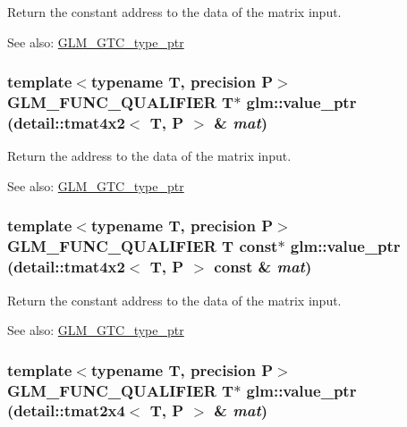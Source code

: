 Return the constant address to the data of the matrix input. \begin{Desc}
\item[See also:]\hyperlink{group__gtc__type__ptr}{GLM\_\-GTC\_\-type\_\-ptr} \end{Desc}
\hypertarget{group__gtc__type__ptr_gcf65ffcdfc741ebebedfc7a50e2bde7f}{
\subsubsection[value\_\-ptr]{\setlength{\rightskip}{0pt plus 5cm}template$<$typename T, precision P$>$ GLM\_\-FUNC\_\-QUALIFIER T$\ast$ glm::value\_\-ptr (detail::tmat4x2$<$ T, P $>$ \& {\em mat})}}
\label{group__gtc__type__ptr_gcf65ffcdfc741ebebedfc7a50e2bde7f}


Return the address to the data of the matrix input. \begin{Desc}
\item[See also:]\hyperlink{group__gtc__type__ptr}{GLM\_\-GTC\_\-type\_\-ptr} \end{Desc}
\hypertarget{group__gtc__type__ptr_g548aa4697fc58fdd3d33df6c57777191}{
\subsubsection[value\_\-ptr]{\setlength{\rightskip}{0pt plus 5cm}template$<$typename T, precision P$>$ GLM\_\-FUNC\_\-QUALIFIER T const$\ast$ glm::value\_\-ptr (detail::tmat4x2$<$ T, P $>$ const \& {\em mat})}}
\label{group__gtc__type__ptr_g548aa4697fc58fdd3d33df6c57777191}


Return the constant address to the data of the matrix input. \begin{Desc}
\item[See also:]\hyperlink{group__gtc__type__ptr}{GLM\_\-GTC\_\-type\_\-ptr} \end{Desc}
\hypertarget{group__gtc__type__ptr_g998aae25d0d9de346b951148c61e930e}{
\subsubsection[value\_\-ptr]{\setlength{\rightskip}{0pt plus 5cm}template$<$typename T, precision P$>$ GLM\_\-FUNC\_\-QUALIFIER T$\ast$ glm::value\_\-ptr (detail::tmat2x4$<$ T, P $>$ \& {\em mat})}}
\label{group__gtc__type__ptr_g998aae25d0d9de346b951148c61e930e}


